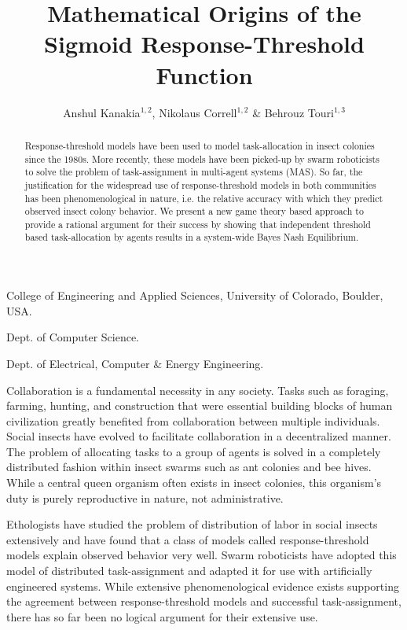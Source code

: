 \documentclass{nature}
\title{Mathematical Origins of the Sigmoid Response-Threshold Function}
\author{Anshul Kanakia$^{1,2}$, Nikolaus Correll$^{1,2}$ \& Behrouz Touri$^{1,3}$}
\begin{document}
\maketitle

\begin{affiliations}
 \item College of Engineering and Applied Sciences, University of Colorado, Boulder, USA. 
 \item Dept. of Computer Science.
 \item Dept. of Electrical, Computer \& Energy Engineering.
\end{affiliations}

\begin{abstract}
Response-threshold models have been used to model task-allocation in insect colonies since the 1980s. More recently, these models have been picked-up by swarm roboticists to solve the problem of task-assignment in multi-agent systems (MAS). So far, the justification for the  widespread use of response-threshold models in both communities has been phenomenological in nature, i.e. the relative accuracy with which they predict observed insect colony behavior. We present a new game theory based approach to provide a rational argument for their success   by showing that independent threshold based task-allocation by agents results in a system-wide Bayes Nash Equilibrium.
\end{abstract}

Collaboration is a fundamental necessity in any society. Tasks such as foraging, farming, hunting, and construction that were essential building blocks of human civilization greatly benefited from collaboration between multiple individuals. Social insects have evolved to facilitate collaboration in a decentralized manner. The problem of allocating tasks to a group of agents is solved in a completely distributed fashion within insect swarms such as ant colonies and bee hives. While a central queen organism often exists in insect colonies, this organism's duty is purely reproductive in nature, not administrative. 

Ethologists have studied the problem of distribution of labor in social insects extensively and have found that a class of models called response-threshold models explain observed behavior very well. Swarm roboticists have adopted this model of distributed task-assignment and adapted it for use with artificially engineered systems. While extensive phenomenological evidence exists supporting the agreement between response-threshold models and successful task-assignment, there has so far been no logical argument for their extensive use. 
\end{document}
